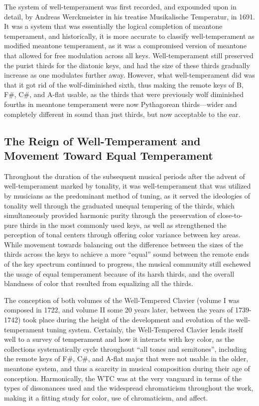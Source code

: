 The system of well-temperament was first recorded, and expounded upon in
detail, by Andreas Werckmeister in his treatise Musikalische Temperatur,
in 1691. It was a system that was essentially the logical completion of
meantone temperament, and historically, it is more accurate to classify
well-temperament as modified meantone temperament, as it was a
compromised version of meantone that allowed for free modulation across
all keys. Well-temperament still preserved the purist thirds for the
diatonic keys, and had the size of these thirds gradually increase as
one modulates further away. However, what well-temperament did was that
it got rid of the wolf-diminished sixth, thus making the remote keys of
B, F\#, C\#, and A-flat usable, as the thirds that were previously wolf
diminished fourths in meantone temperament were now Pythagorean
thirds---wider and completely different in sound than just thirds, but
now acceptable to the ear.

\subsection{The Reign of Well-Temperament and Movement Toward Equal
Temperament}\label{the-reign-of-well-temperament-and-movement-toward-equal-temperament}

Throughout the duration of the subsequent musical periods after the
advent of well-temperament marked by tonality, it was well-temperament
that was utilized by musicians as the predominant method of tuning, as
it served the ideologies of tonality well through the graduated unequal
tempering of the thirds, which simultaneously provided harmonic purity
through the preservation of close-to-pure thirds in the most commonly
used keys, as well as strengthened the perception of tonal centers
through offering color variance between key areas. While movement
towards balancing out the difference between the sizes of the thirds
across the keys to achieve a more ``equal'' sound between the remote
ends of the key spectrum continued to progress, the musical community
still eschewed the usage of equal temperament because of its harsh
thirds, and the overall blandness of color that resulted from equalizing
all the thirds.

The conception of both volumes of the Well-Tempered Clavier (volume I
was composed in 1722, and volume II some 20 years later, between the
years of 1739-1742) took place during the height of the development and
evolution of the well-temperament tuning system. Certainly, the
Well-Tempered Clavier lends itself well to a survey of temperament and
how it interacts with key color, as the collections systematically cycle
throughout ``all tones and semitones'', including the remote keys of
F\#, C\#, and A-flat major that were not usable in the older, meantone
system, and thus a scarcity in musical composition during their age of
conception. Harmonically, the WTC was at the very vanguard in terms of
the types of dissonances used and the widespread chromaticism throughout
the work, making it a fitting study for color, use of chromaticism, and
affect.

